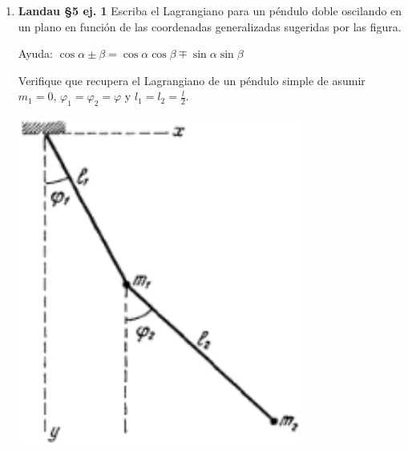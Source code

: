\documentclass[11pt,spanish,a4paper]{article}
\begin{document}
\begin{enumerate}
\item \begin{minipage}[t][4.5cm]{0.7\textwidth}
\textbf{Landau \S5 ej. 1}
Escriba el Lagrangiano para un péndulo doble oscilando en un plano en función de las coordenadas generalizadas sugeridas por las figura.

Ayuda: \( \cos{\alpha \pm \beta }=\cos{ \alpha} \cos{ \beta \mp \sin \alpha} \sin{ \beta } \)

Verifique que recupera el Lagrangiano de un péndulo simple de asumir \(m_1=0\), \(\varphi_1 = \varphi_2 = \varphi\) y \(l_1 = l_2 = \frac{l}{2}\).
\end{minipage}
	\begin{minipage}[c][2.5cm][t]{0.3\textwidth}
	\includegraphics[width=0.75\textwidth]{landauFig52_1.png}
\end{minipage}




\end{enumerate}
\end{document}
